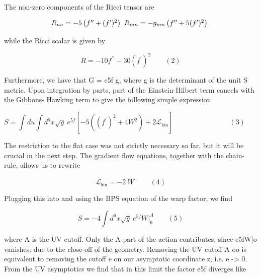\documentclass{article}
\begin{document}
\sloppy

The non-zero components of the Ricci tensor are


\begin{equation}
\begin{array} { c c c } { R _ { u u } = - 5 \left ( f ^ { \prime \prime } + ( f ^ { \prime } ) ^ { 2 } \right ) ~ R _ { m n } = - g _ { m n } \left ( f ^ { \prime \prime } + 5 ( f ^ { \prime } ) ^ { 2 } \right ) ~ }\end{array}
\end{equation}


while the Ricci scalar is given by


\begin{equation}
R = - 1 0 f ^ { \prime \prime } - 3 0 ( f ^ { \prime } ) ^ { 2 } \qquad ( 2 )
\end{equation}


Furthermore, we have that G = e5f g, where g is the determinant of the unit S metric.
Upon integration by parts, part of the Einstein-Hilbert term cancels with the Gibbons-
Hawking term to give the following simple expression


\begin{equation}
S = \int d u \int d ^ { 5 } x \sqrt { g } ~ e ^ { 5 f } \left [ - 5 \left ( ( f ^ { \prime } ) ^ { 2 } + 4 W ^ { 2 } \right ) + 2 \mathcal { L } _ { \mathrm { k i n } } \right ] \qquad \qquad \qquad \qquad ( 3 ) \qquad
\end{equation}


The restriction to the flat case was not strictly necessary so far, but it will be crucial in the
next step. The gradient flow equations, together with the chain-rule, allows us to rewrite


\begin{equation}
\mathcal { L } _ \mathsf { k i n } = - 2 ~ W ^ { \prime } \qquad ( 4 )
\end{equation}


Plugging this into and using the BPS equation of the warp factor, we find


\begin{equation}
S = - 4 \int d ^ { 6 } \! x \sqrt { g } ~ e ^ { 5 f } W \Big | _ { 6 } ^ { \Lambda } \qquad ( 5 )
\end{equation}


where A is the UV cutoff. Only the A part of the action contributes, since e5fW|o vanishes.
due to the close-off of the geometry. Removing the UV cutoff A  oo is equivalent to
removing the cutoff e on our asymptotic coordinate z, i.e. e -> 0. From the UV asymptotics
we find that in this limit the factor e5f diverges like
\end{document}
